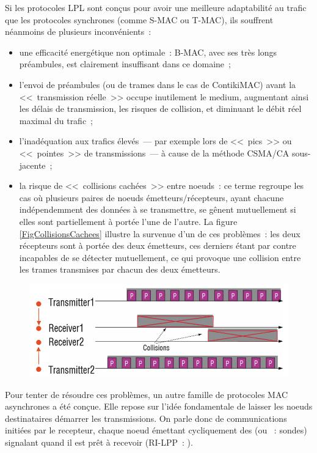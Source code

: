 Si les protocoles LPL sont conçus pour avoir une meilleure adaptabilité
au trafic que les protocoles synchrones (comme S-MAC ou T-MAC),
ils souffrent néanmoins de plusieurs inconvénients~:
\begin{itemize}
\item une efficacité energétique non optimale~: B-MAC, avec ses très longs
préambules, est clairement insuffisant dans ce domaine~;
\item l'envoi de préambules (ou de trames dans le cas de ContikiMAC)
avant la <<~transmission réelle~>> occupe inutilement le medium,
augmentant ainsi les délais de transmission, les risques de collision,
et diminuant le débit réel maximal du trafic~;
\item l'inadéquation aux trafics élevés~--- par exemple lors de <<~pics~>>
ou <<~pointes~>> de transmissions~--- à cause de la méthode CSMA/CA
sous-jacente~;
\item la risque de <<~collisions cachées~>> entre noeuds~: ce terme
regroupe les cas où plusieurs paires de noeuds émetteurs/récepteurs,
ayant chacune indépendemment des données à se transmettre, se gênent
mutuellement si elles sont partiellement à portée l'une de l'autre.
La figure \vref{FigCollisionsCachees} illustre la survenue
d'un de ces problèmes~: les deux récepteurs sont à portée des deux
émetteurs, ces derniers étant par contre incapables de se détecter
mutuellement, ce qui provoque une collision entre les trames transmises
par chacun des deux émetteurs.
\end{itemize}

\begin{figure}[!hbt]
\centering
\includegraphics[width=12.5cm]{images/ch3-collisions-cachees.png}
\label{FigCollisionsCachees}
\end{figure}

Pour tenter de résoudre ces problèmes, un autre famille de protocoles
MAC asynchrones a été conçue. Elle repose sur l'idée fondamentale
de laisser les noeuds destinataires démarrer les transmissions.
On parle donc de communications initiées par le recepteur, chaque noeud
émettant cycliquement des  (ou ~: sondes)
signalant quand il est prêt à recevoir (RI-LPP~: ).

